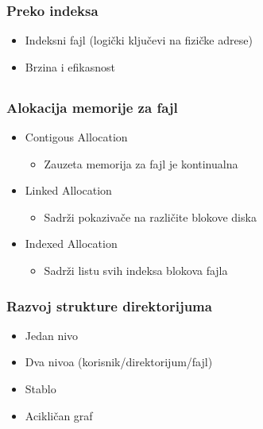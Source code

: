 \documentclass{beamer}
\begin{document}
\begin{frame}
    \frametitle{Preko indeksa}
    \begin{itemize}
        \item Indeksni fajl (logički ključevi na fizičke adrese) \newline
        \item Brzina i efikasnost
    \end{itemize}
\end{frame}

\subsection*{}

\begin{frame}
    \frametitle{Alokacija memorije za fajl}
    \begin{itemize}
        \item Contigous Allocation \begin{itemize}
            \item Zauzeta memorija za fajl je kontinualna \newline
        \end{itemize}
        \item Linked Allocation \begin{itemize}
            \item Sadrži pokazivače na različite blokove diska \newline
        \end{itemize}
        \item Indexed Allocation \begin{itemize}
            \item Sadrži listu svih indeksa blokova fajla
        \end{itemize}
    \end{itemize}
\end{frame}

\begin{frame}
    \frametitle{Razvoj strukture direktorijuma}
    \begin{itemize}
        \item Jedan nivo \newline
        \item Dva nivoa (korisnik/direktorijum/fajl) \newline
        \item Stablo \newline
        \item Acikličan graf
    \end{itemize}
\end{frame}
\end{document}
